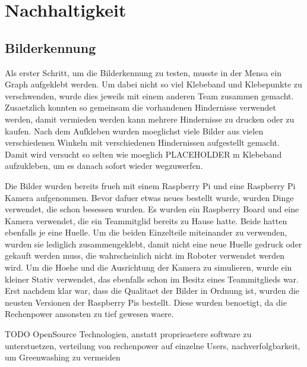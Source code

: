 \section{Nachhaltigkeit}







\subsection{Bilderkennung}

Als erster Schritt, um die Bilderkennung zu testen, musste in der Mensa ein Graph aufgeklebt werden.
Um dabei nicht so viel Klebeband und Klebepunkte zu verschwenden, wurde dies jeweils mit einem anderen Team zusammen gemacht. Zusaetzlich konnten so gemeinsam die vorhandenen Hindernisse verwendet werden, damit vermieden werden kann mehrere Hindernisse zu drucken oder zu kaufen.
Nach dem Aufkleben wurden moeglichst viele Bilder aus vielen verschiedenen Winkeln mit verschiedenen Hindernissen aufgestellt gemacht. Damit wird versucht so selten wie moeglich PLACEHOLDER m Klebeband aufzukleben, um es danach sofort wieder wegzuwerfen.

Die Bilder wurden bereits frueh mit einem Raspberry Pi und eine Raspberry Pi Kamera aufgenommen. Bevor dafuer etwas neues bestellt wurde, wurden Dinge verwendet, die schon besessen wurden. Es wurden ein Raspberry Board und eine Kamera verwendet, die ein Teammitglid bereits zu Hause hatte. Beide hatten ebenfalls je eine Huelle.
Um die beiden Einzelteile miteinander zu verwenden, wurden sie lediglich zusammengeklebt, damit nicht eine neue Huelle gedruck oder gekauft werden muss, die wahrscheinlich nicht im Roboter verwendet werden wird.
Um die Hoehe und die Ausrichtung der Kamera zu simulieren, wurde ein kleiner Stativ verwendet, das ebenfalls schon im Besitz eines Teammitglieds war.
Erst nachdem klar war, dass die Qualitaet der Bilder in Ordnung ist, wurden die neusten Versionen der Raspberry Pis bestellt. Diese wurden benoetigt, da die Rechenpower ansonsten zu tief gewesen waere.


TODO OpenSource Technologien, anstatt proprieaetere software zu unterstuetzen, verteilung von rechenpower auf einzelne Users, nachverfolgbarkeit, um Greenwashing zu vermeiden\cite{oss-sustainability}

